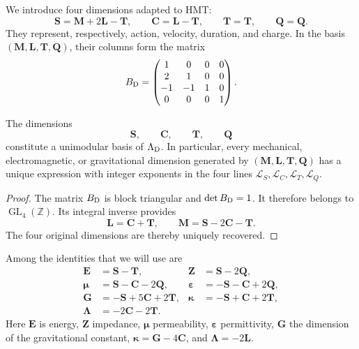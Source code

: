 We introduce four dimensions adapted to HMT:
\[
 \mathbf S=\mathbf M+2\mathbf L-\mathbf T,
 \qquad
 \mathbf C=\mathbf L-\mathbf T,
 \qquad
 \mathbf T=\mathbf T,
 \qquad
 \mathbf Q=\mathbf Q.
\]
They represent, respectively, action, velocity, duration, and charge. In the
basis \((\mathbf M,\mathbf L,\mathbf T,\mathbf Q)\), their columns form the
matrix
\[
 B_{\rm D}=
 \begin{pmatrix}
 1&0&0&0\\
 2&1&0&0\\
 -1&-1&1&0\\
 0&0&0&1
 \end{pmatrix}.
\]

\begin{theorem}
\label{thm:base-dimensional-hmt}
The dimensions
\[
 \mathbf S,\qquad\mathbf C,\qquad\mathbf T,\qquad\mathbf Q
\]
constitute a unimodular basis of
\(\Lambda_{\rm D}\). In particular, every mechanical,
electromagnetic, or gravitational dimension generated by
\((\mathbf M,\mathbf L,\mathbf T,\mathbf Q)\) has a unique expression with
integer exponents in the four lines
\(\mathcal L_S,\mathcal L_C,\mathcal L_T,\mathcal L_Q\).
\end{theorem}

\begin{proof}
The matrix \(B_{\rm D}\) is block triangular and
\(\det B_{\rm D}=1\). It therefore belongs to
\(\operatorname{GL}_4(\mathbb Z)\). Its integral inverse provides
\[
 \mathbf L=\mathbf C+\mathbf T,
 \qquad
 \mathbf M=\mathbf S-2\mathbf C-\mathbf T.
\]
The four original dimensions are thereby uniquely recovered.
\end{proof}

Among the identities that we will use are
\begin{align}
 \mathbf E&=\mathbf S-\mathbf T,
 &\mathbf Z&=\mathbf S-2\mathbf Q,\label{eq:dim-EZ}\\
 \boldsymbol\mu&=\mathbf S-\mathbf C-2\mathbf Q,
 &\boldsymbol\varepsilon&=-\mathbf S-\mathbf C+2\mathbf Q,
 \label{eq:dim-mueps}\\
 \mathbf G&=-\mathbf S+5\mathbf C+2\mathbf T,
 &\boldsymbol\kappa&=-\mathbf S+\mathbf C+2\mathbf T,
 \label{eq:dim-Gkappa}\\
 \boldsymbol\Lambda&=-2\mathbf C-2\mathbf T.
 \label{eq:dim-Lambda}
\end{align}
Here \(\mathbf E\) is energy, \(\mathbf Z\) impedance,
\(\boldsymbol\mu\) permeability, \(\boldsymbol\varepsilon\)
permittivity, \(\mathbf G\) the dimension of the gravitational constant,
\(\boldsymbol\kappa=\mathbf G-4\mathbf C\), and
\(\boldsymbol\Lambda=-2\mathbf L\).

